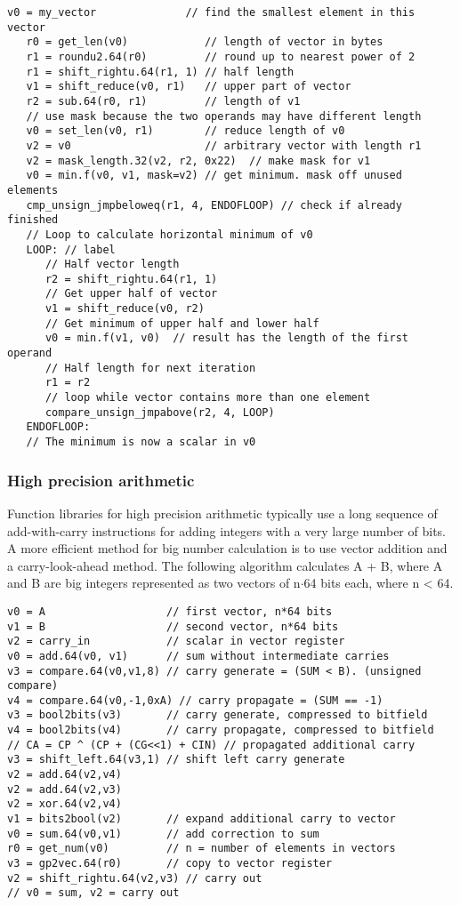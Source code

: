 \documentclass[forwardcom.tex]{subfiles}
\begin{document}
\begin{lstlisting}[frame=none]
   v0 = my_vector              // find the smallest element in this vector
   r0 = get_len(v0)            // length of vector in bytes
   r1 = roundu2.64(r0)         // round up to nearest power of 2
   r1 = shift_rightu.64(r1, 1) // half length
   v1 = shift_reduce(v0, r1)   // upper part of vector
   r2 = sub.64(r0, r1)         // length of v1
   // use mask because the two operands may have different length
   v0 = set_len(v0, r1)        // reduce length of v0
   v2 = v0                     // arbitrary vector with length r1
   v2 = mask_length.32(v2, r2, 0x22)  // make mask for v1
   v0 = min.f(v0, v1, mask=v2) // get minimum. mask off unused elements
   cmp_unsign_jmpbeloweq(r1, 4, ENDOFLOOP) // check if already finished
   // Loop to calculate horizontal minimum of v0
   LOOP: // label
      // Half vector length
      r2 = shift_rightu.64(r1, 1)
      // Get upper half of vector
      v1 = shift_reduce(v0, r2)
      // Get minimum of upper half and lower half
      v0 = min.f(v1, v0)  // result has the length of the first operand
      // Half length for next iteration
      r1 = r2
      // loop while vector contains more than one element
      compare_unsign_jmpabove(r2, 4, LOOP)
   ENDOFLOOP:      
   // The minimum is now a scalar in v0
\end{lstlisting}


\subsubsection{High precision arithmetic} \label{highPrecisionArithmetic}
Function libraries for high precision arithmetic typically use a long sequence of add-with-carry instructions for adding integers with a very large number of bits. A more efficient method for big number calculation is to use vector addition and a carry-look-ahead method. The following algorithm calculates A + B, where A and B are big integers represented as two vectors of n$\cdot$64 bits each, where n \textless{} 64.
\vspace{2mm}

\begin{lstlisting}[frame=none]
v0 = A                   // first vector, n*64 bits
v1 = B                   // second vector, n*64 bits
v2 = carry_in            // scalar in vector register
v0 = add.64(v0, v1)      // sum without intermediate carries
v3 = compare.64(v0,v1,8) // carry generate = (SUM < B). (unsigned compare)
v4 = compare.64(v0,-1,0xA) // carry propagate = (SUM == -1) 
v3 = bool2bits(v3)       // carry generate, compressed to bitfield
v4 = bool2bits(v4)       // carry propagate, compressed to bitfield
// CA = CP ^ (CP + (CG<<1) + CIN) // propagated additional carry
v3 = shift_left.64(v3,1) // shift left carry generate
v2 = add.64(v2,v4)
v2 = add.64(v2,v3)
v2 = xor.64(v2,v4)
v1 = bits2bool(v2)       // expand additional carry to vector
v0 = sum.64(v0,v1)       // add correction to sum
r0 = get_num(v0)         // n = number of elements in vectors
v3 = gp2vec.64(r0)       // copy to vector register
v2 = shift_rightu.64(v2,v3) // carry out
// v0 = sum, v2 = carry out
\end{lstlisting}
\vspace{2mm}
\end{document}
